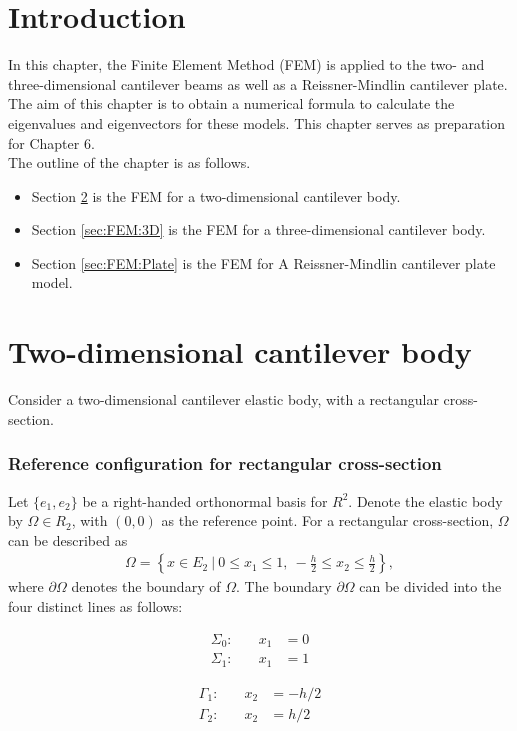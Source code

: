 \documentclass[../../main.tex]{subfiles}
\begin{document}
\section{Introduction}
In this chapter, the Finite Element Method (FEM) is applied to the two- and three-dimensional cantilever beams as well as a Reissner-Mindlin cantilever plate. The aim of this chapter is to obtain a numerical formula to calculate the eigenvalues and eigenvectors for these models. This chapter serves as preparation for Chapter 6.\\

The outline of the chapter is as follows.
\begin{itemize}
	\item[] Section \ref{sec:FEM:2D} is the FEM for a two-dimensional cantilever body.
	\item[] Section \ref{sec:FEM:3D} is the FEM for a three-dimensional cantilever body. 
	\item[] Section \ref{sec:FEM:Plate} is the FEM for A Reissner-Mindlin cantilever plate model. 
\end{itemize}

\section{Two-dimensional cantilever body} \label{sec:FEM:2D}
Consider a two-dimensional cantilever elastic body, with a rectangular cross-section.

\subsubsection{Reference configuration for rectangular cross-section}
Let $\{e_1,e_2\}$ be a right-handed orthonormal basis for $R^2$. Denote the elastic body by $\Omega \in R_2$, with $(0,0)$ as the reference point. For a rectangular cross-section, $\Omega$ can be described as
\begin{eqnarray*}
	\Omega = \left \{ x \in E_2 \ | \ 0 \leq x_1 \leq 1, \ -\frac{h}{2} \leq x_2 \leq \frac{h}{2} \right \},
\end{eqnarray*} where $\partial \Omega$ denotes the boundary of $\Omega$. The boundary $\partial \Omega$ can be divided into the four distinct lines as follows:

\noindent\begin{minipage}{.5\linewidth}
	\begin{eqnarray*}
		\Sigma_0:& \quad x_1 &= 0\\
		\Sigma_1:& \quad x_1 &= 1
	\end{eqnarray*}
\end{minipage}%
\begin{minipage}{.5\linewidth}
	\begin{eqnarray*}
		\Gamma_1:& \quad x_2 &= -{h}/{2}\\
		\Gamma_2:& \quad x_2 &= {h}/{2}
	\end{eqnarray*}
\end{minipage}
\end{document}
